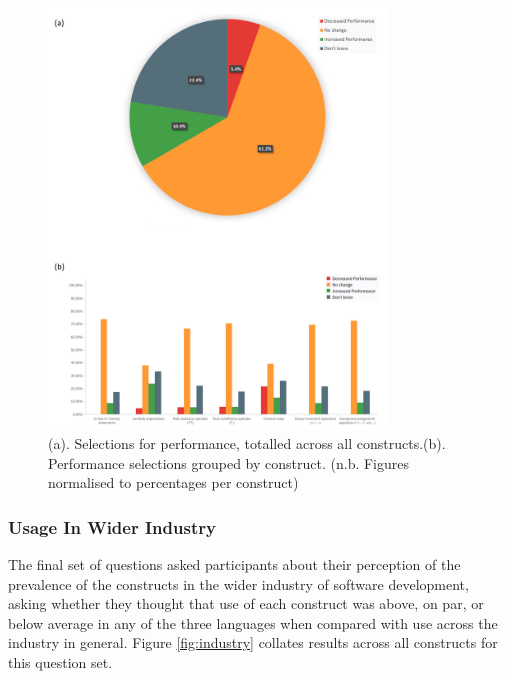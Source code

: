 \documentclass{article}
\begin{document}
            \begin{figure}[htbp]
                \centering
                \includegraphics[width=0.8\textwidth]{performance}
                \caption{(a). Selections for performance, totalled across all constructs.\newline(b). Performance selections grouped by construct. (n.b. Figures normalised to percentages per construct)}
                \label{fig:performance}
            \end{figure}   
        \subsubsection{Usage In Wider Industry}
            The final set of questions asked participants about their perception of the prevalence of the constructs in the wider industry of software development, asking whether they thought that use of each construct was above, on par, or below average in any of the three languages when compared with use across the industry in general. Figure \ref{fig:industry} collates results across all constructs for this question set.
\end{document}
